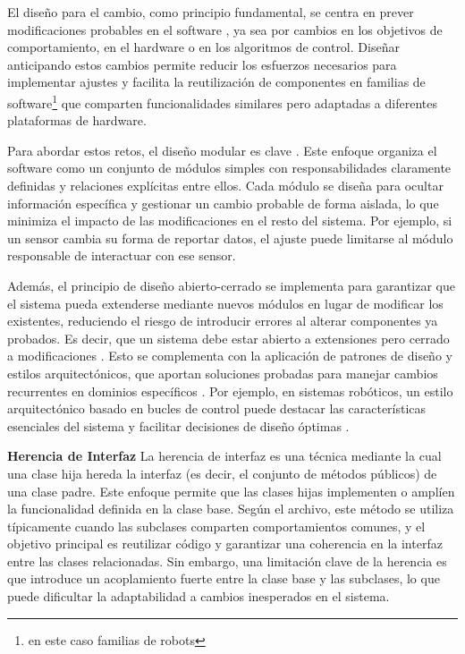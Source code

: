 El diseño para el cambio, como principio fundamental, se centra en prever modificaciones probables en el software \cite{Parnas1972, ShawGarlan1996, ghezzi2003, bass2003, DBLP:books/daglib/0030743}, ya sea por cambios en los objetivos de comportamiento, en el hardware o en los algoritmos de control. Diseñar anticipando estos cambios permite reducir los esfuerzos necesarios para implementar ajustes y facilita la reutilización de componentes en familias de software\footnote{en este caso familias de robots} que comparten funcionalidades similares pero adaptadas a diferentes plataformas de hardware\cite{Parnas02, DBLP:books/daglib/0019719}.

Para abordar estos retos, el diseño modular es clave \cite{Parnas1972}. Este enfoque organiza el software como un conjunto de módulos simples con responsabilidades claramente definidas y relaciones explícitas entre ellos. Cada módulo se diseña para ocultar información específica y gestionar un cambio probable de forma aislada, lo que minimiza el impacto de las modificaciones en el resto del sistema. Por ejemplo, si un sensor cambia su forma de reportar datos, el ajuste puede limitarse al módulo responsable de interactuar con ese sensor.

Además, el principio de diseño abierto-cerrado \cite{DBLP:books/ph/Meyer97} se implementa para garantizar que el sistema pueda extenderse mediante nuevos módulos en lugar de modificar los existentes, reduciendo el riesgo de introducir errores al alterar componentes ya probados. Es decir, que un sistema debe estar abierto a extensiones pero cerrado a modificaciones \cite{DBLP:books/ph/Meyer97}. Esto se complementa con la aplicación de patrones de diseño y estilos arquitectónicos, que aportan soluciones probadas para manejar cambios recurrentes en dominios específicos \cite{Gamma:1995:DPE:186897, DBLP:books/lib/BuschmannHS07}. Por ejemplo, en sistemas robóticos, un estilo arquitectónico basado en bucles de control puede destacar las características esenciales del sistema y facilitar decisiones de diseño óptimas \cite{ShawGarlan1996}.

\textbf{Herencia de Interfaz}
La herencia de interfaz es una técnica mediante la cual una clase hija hereda la interfaz (es decir, el conjunto de métodos públicos) de una clase padre. Este enfoque permite que las clases hijas implementen o amplíen la funcionalidad definida en la clase base. Según el archivo, este método se utiliza típicamente cuando las subclases comparten comportamientos comunes, y el objetivo principal es reutilizar código y garantizar una coherencia en la interfaz entre las clases relacionadas. Sin embargo, una limitación clave de la herencia es que introduce un acoplamiento fuerte entre la clase base y las subclases, lo que puede dificultar la adaptabilidad a cambios inesperados en el sistema.

